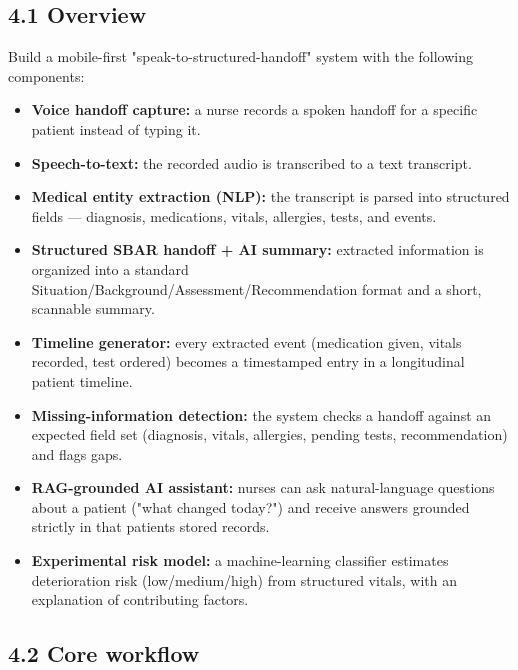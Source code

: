 \documentclass[
]{article}
\begin{document}
\subsection{4.1 Overview}\label{overview}

Build a mobile-first "speak-to-structured-handoff" system with the
following components:

\begin{itemize}
\item
  \textbf{Voice handoff capture:} a nurse records a spoken handoff for a
  specific patient instead of typing it.
\item
  \textbf{Speech-to-text:} the recorded audio is transcribed to a text
  transcript.
\item
  \textbf{Medical entity extraction (NLP):} the transcript is parsed
  into structured fields --- diagnosis, medications, vitals, allergies,
  tests, and events.
\item
  \textbf{Structured SBAR handoff + AI summary:} extracted information
  is organized into a standard
  Situation/Background/Assessment/Recommendation format and a short,
  scannable summary.
\item
  \textbf{Timeline generator:} every extracted event (medication given,
  vitals recorded, test ordered) becomes a timestamped entry in a
  longitudinal patient timeline.
\item
  \textbf{Missing-information detection:} the system checks a handoff
  against an expected field set (diagnosis, vitals, allergies, pending
  tests, recommendation) and flags gaps.
\item
  \textbf{RAG-grounded AI assistant:} nurses can ask natural-language
  questions about a patient ("what changed today?") and receive answers
  grounded strictly in that patient\textquotesingle s stored records.
\item
  \textbf{Experimental risk model:} a machine-learning classifier
  estimates deterioration risk (low/medium/high) from structured vitals,
  with an explanation of contributing factors.
\end{itemize}

\subsection{4.2 Core workflow}\label{core-workflow}
\end{document}
